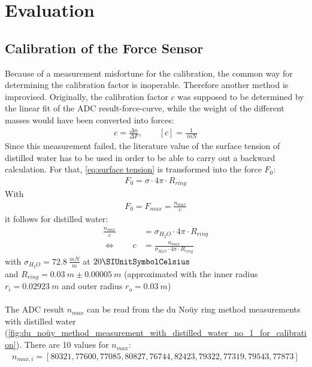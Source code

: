 \chapter{Evaluation}
%
\section{Calibration of the Force Sensor}
Because of a measurement misfortune for the calibration, the common way for determining the calibration factor is inoperable. Therefore another method is improvised. Originally, the calibration factor $ c $ was supposed to be determined by the linear fit of the ADC result-force-curve, while the weight of the different masses would have been converted into forces:
\begin{align}
c=\frac{\Delta n}{\Delta F}, \qquad [c]=\frac{1}{\SI{}{mN}}
\end{align}
Since this measurement failed, the literature value of the surface tension of distilled water has to be used in order to be able to carry out a backward calculation. For that, \cref{eq:surface tension} is transformed into the force $ F_0 $:
\begin{align*}
F_0=\sigma \cdot 4\pi \cdot R_{ring}
\end{align*}
With
\begin{align}
F_0=F_{max}=\frac{n_{max}}{c}
\label{eq:force}
\end{align}
it follows for distilled water:
\begin{align}
\frac{n_{max}}{c}&=\sigma_{H_2O} \cdot 4\pi \cdot R_{ring} \nonumber \\
\Leftrightarrow \qquad c&=\frac{n_{max}}{\sigma_{H_2O} \cdot 4\pi \cdot R_{ring}}
\label{eq:calibration factor}
\end{align}
with $ \sigma_{H_2O}=\SI{72.8}{\frac{mN}{m}} $ at $ 20 \SIUnitSymbolCelsius $ \cite{Eichler.2016} \\
and $ R_{ring}=\SI{0.03}{m} \pm \SI{0.00005}{m} $ (approximated with the inner radius $ r_i=\SI{0.02923}{m} $ and outer radius $ r_o=\SI{0.03}{m} $)
\\\\
The ADC result $ n_{max} $ can be read from the du Noüy ring method measurements with distilled water (\cref{fig:du_noüy_method_measurement_with_distilled_water_no_1_for_calibration}). There are 10 values for $ n_{max} $:
\begin{align*}
n_{max,i}=[80321, 77600, 77085, 80827, 76744, 82423, 79322, 77319, 79543, 77873]
\end{align*}
